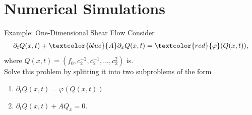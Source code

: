 \section{Numerical Simulations}
\begin{frame}{Example: One-Dimensional Shear Flow}
	\scriptsize
Consider
	\begin{align}
		\partial_t Q(x,t) + \textcolor{blue}{A}\partial_x Q(x,t) = \textcolor{red}{\varphi} (Q(x,t)), \label{conservationlaws}
	\end{align}
	where $Q(x,t) = (f_0, c^{-2}_2, c^{-1}_2, ..., c^2_2)$ is. \\
	\vspace{0.5cm}
	Solve this problem by splitting it into two subproblems of the form
	\begin{enumerate}
		\item $\partial_t Q(x,t)  = \varphi (Q(x,t))$
		\item $\partial_t Q(x,t) + A Q_x=0$.
	\end{enumerate}
\end{frame}

